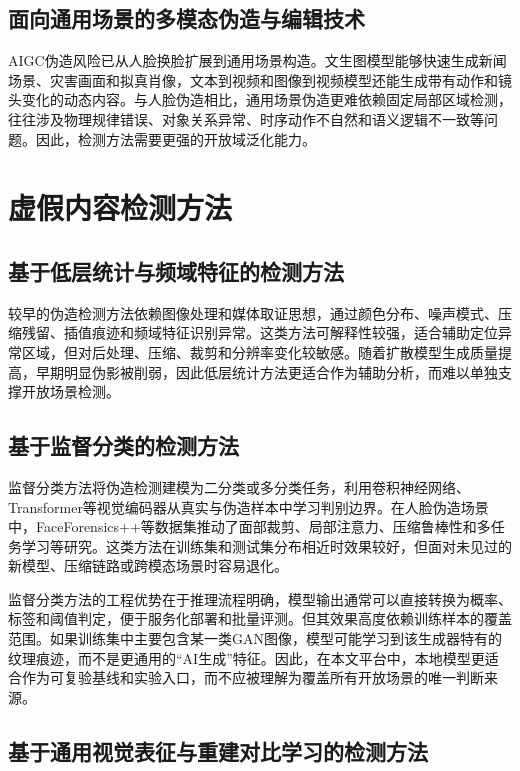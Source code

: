 \subsection{面向通用场景的多模态伪造与编辑技术}

AIGC伪造风险已从人脸换脸扩展到通用场景构造。文生图模型能够快速生成新闻场景、灾害画面和拟真肖像，文本到视频和图像到视频模型还能生成带有动作和镜头变化的动态内容。与人脸伪造相比，通用场景伪造更难依赖固定局部区域检测，往往涉及物理规律错误、对象关系异常、时序动作不自然和语义逻辑不一致等问题。因此，检测方法需要更强的开放域泛化能力。

\section{虚假内容检测方法}

\subsection{基于低层统计与频域特征的检测方法}

较早的伪造检测方法依赖图像处理和媒体取证思想，通过颜色分布、噪声模式、压缩残留、插值痕迹和频域特征识别异常\cite{ref9,ref15,ref22}。这类方法可解释性较强，适合辅助定位异常区域，但对后处理、压缩、裁剪和分辨率变化较敏感。随着扩散模型生成质量提高，早期明显伪影被削弱，因此低层统计方法更适合作为辅助分析，而难以单独支撑开放场景检测。

\subsection{基于监督分类的检测方法}

监督分类方法将伪造检测建模为二分类或多分类任务，利用卷积神经网络、Transformer等视觉编码器从真实与伪造样本中学习判别边界\cite{ref9,ref11}。在人脸伪造场景中，FaceForensics++等数据集推动了面部裁剪、局部注意力、压缩鲁棒性和多任务学习等研究\cite{ref13}。这类方法在训练集和测试集分布相近时效果较好，但面对未见过的新模型、压缩链路或跨模态场景时容易退化。

监督分类方法的工程优势在于推理流程明确，模型输出通常可以直接转换为概率、标签和阈值判定，便于服务化部署和批量评测。但其效果高度依赖训练样本的覆盖范围。如果训练集中主要包含某一类GAN图像，模型可能学习到该生成器特有的纹理痕迹，而不是更通用的“AI生成”特征。因此，在本文平台中，本地模型更适合作为可复验基线和实验入口，而不应被理解为覆盖所有开放场景的唯一判断来源。

\subsection{基于通用视觉表征与重建对比学习的检测方法}


